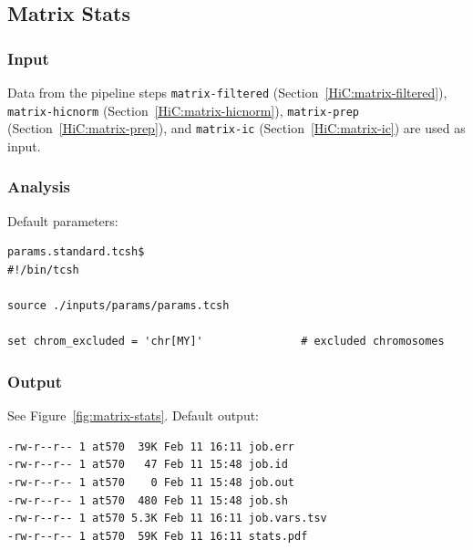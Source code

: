 \subsection{Matrix Stats}\label{HiC:matrix-stats}%
\subsubsection{Input} %
Data from the pipeline steps %
\texttt{matrix-filtered} (Section~\ref{HiC:matrix-filtered}), \texttt{matrix-hicnorm} (Section~\ref{HiC:matrix-hicnorm}), \texttt{matrix-prep} (Section~\ref{HiC:matrix-prep}), and \texttt{matrix-ic} (Section~\ref{HiC:matrix-ic}) are used as input.
\subsubsection{Analysis} %
Default parameters:
\begin{lstlisting}
params.standard.tcsh$
#!/bin/tcsh

source ./inputs/params/params.tcsh

set chrom_excluded = 'chr[MY]'               # excluded chromosomes

\end{lstlisting}
\subsubsection{Output} %
See Figure~\ref{fig:matrix-stats}. Default output: %
\begin{lstlisting}
-rw-r--r-- 1 at570  39K Feb 11 16:11 job.err
-rw-r--r-- 1 at570   47 Feb 11 15:48 job.id
-rw-r--r-- 1 at570    0 Feb 11 15:48 job.out
-rw-r--r-- 1 at570  480 Feb 11 15:48 job.sh
-rw-r--r-- 1 at570 5.3K Feb 11 16:11 job.vars.tsv
-rw-r--r-- 1 at570  59K Feb 11 16:11 stats.pdf
\end{lstlisting}


